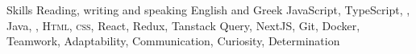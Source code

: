 
\begin{rubric}{Skills}
\entry*[Languages]
	Reading, writing and speaking English and Greek
	JavaScript, TypeScript, , Java, ,
	\textsc{Html, css}, React, Redux, Tanstack Query, NextJS,
	Git, Docker, 
\entry*
	Teamwork, Adaptability, Communication, Curiosity, Determination
\end{rubric}
